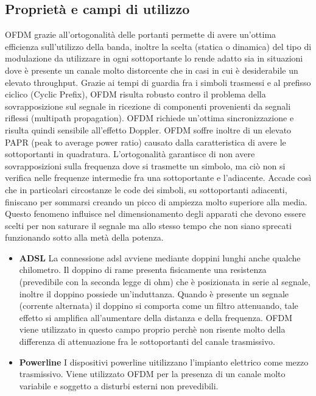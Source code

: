 \begin{itemize}
\section{Proprietà e campi di utilizzo}
OFDM grazie all'ortogonalità delle portanti permette di avere un'ottima efficienza sull'utilizzo della banda, inoltre la scelta (statica o dinamica) del tipo di modulazione da utilizzare in ogni sottoportante lo rende adatto sia in situazioni dove è presente un canale molto distorcente che in casi in cui è desiderabile un elevato throughput. Grazie ai tempi di guardia fra i simboli trasmessi e al prefisso ciclico (Cyclic Prefix), OFDM risulta robusto contro il problema della sovrapposizione sul segnale in ricezione di componenti provenienti da segnali riflessi (multipath propagation). OFDM richiede un'ottima sincronizzazione e risulta quindi sensibile all'effetto Doppler. OFDM soffre inoltre di un elevato PAPR (peak to average power ratio) causato dalla caratteristica di avere le sottoportanti in quadratura. L'ortogonalità garantisce di non avere sovrapposizioni sulla frequenza dove si trasmette un simbolo, ma ciò non si verifica nelle frequenze intermedie fra una sottoportante e l'adiacente. Accade così che in particolari circostanze le code dei simboli, su sottoportanti adiacenti, finiscano per sommarsi creando un picco di ampiezza molto superiore alla media. Questo fenomeno influisce nel dimensionamento degli apparati che devono essere scelti per non saturare il segnale ma allo stesso tempo che non siano sprecati funzionando sotto alla metà della potenza.
\cite{papr}
\begin{itemize}
	\item \textbf{ADSL} La connessione adsl avviene mediante doppini lunghi anche qualche chilometro. Il doppino di rame presenta fisicamente una resistenza (prevedibile con la seconda legge di ohm) che è posizionata in serie al segnale, inoltre il doppino possiede un'induttanza. Quando è presente un segnale (corrente alternata) il doppino si comporta come un filtro attenuando, tale effetto si amplifica all'aumentare della distanza e della frequenza. OFDM viene utilizzato in questo campo proprio perchè non risente molto della differenza di attenuazione fra le sottoportanti del canale trasmissivo.
\end{itemize}
\begin{itemize}
	\item \textbf{Powerline} I dispositivi powerline uitilizzano l'impianto elettrico come mezzo trasmissivo. Viene utilizzato OFDM per la presenza di un canale molto variabile e soggetto a disturbi esterni non prevedibili.

\end{itemize}
\end{itemize}
